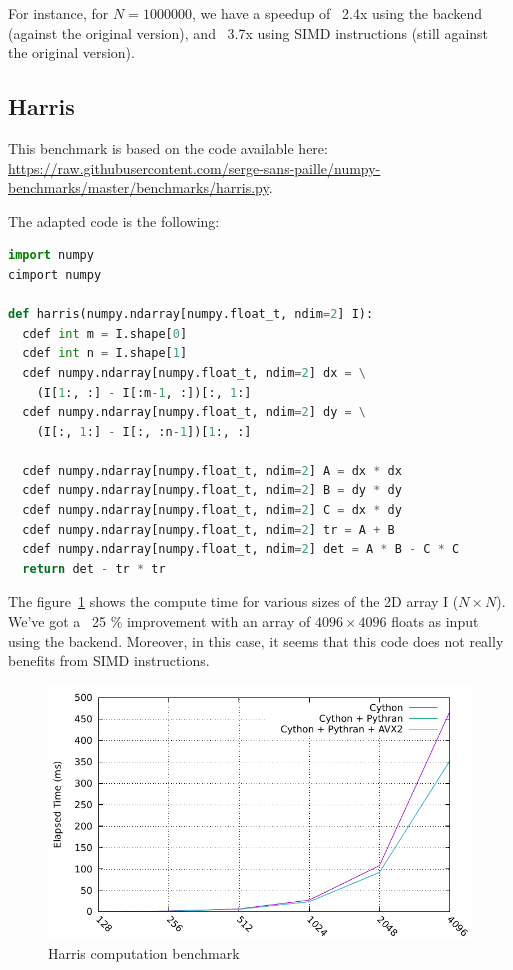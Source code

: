 \documentclass{deliverablereport}
\begin{document}
For instance, for $N = 1000000$, we have a speedup of ~2.4x using the \Pythran
backend (against the original \Cython version), and ~3.7x using SIMD
instructions (still against the original \Cython version).

\subsection{Harris}

This benchmark is based on the code available here:
\url{https://raw.githubusercontent.com/serge-sans-paille/numpy-benchmarks/master/benchmarks/harris.py}.

The adapted \Cython code is the following:

\begin{lstlisting}[language=python]
import numpy
cimport numpy

def harris(numpy.ndarray[numpy.float_t, ndim=2] I):
  cdef int m = I.shape[0]
  cdef int n = I.shape[1]
  cdef numpy.ndarray[numpy.float_t, ndim=2] dx = \
    (I[1:, :] - I[:m-1, :])[:, 1:]
  cdef numpy.ndarray[numpy.float_t, ndim=2] dy = \
    (I[:, 1:] - I[:, :n-1])[1:, :]

  cdef numpy.ndarray[numpy.float_t, ndim=2] A = dx * dx
  cdef numpy.ndarray[numpy.float_t, ndim=2] B = dy * dy
  cdef numpy.ndarray[numpy.float_t, ndim=2] C = dx * dy
  cdef numpy.ndarray[numpy.float_t, ndim=2] tr = A + B
  cdef numpy.ndarray[numpy.float_t, ndim=2] det = A * B - C * C
  return det - tr * tr
\end{lstlisting}

The figure~\ref{fig:harris_bench} shows the compute time for various sizes of
the 2D array I ($N \times N$). We've got a ~25 \% improvement with an array of
$4096 \times 4096$ floats as input using the \Pythran backend. Moreover, in this
case, it seems that this code does not really benefits from SIMD instructions.

\begin{figure}[h]
  \caption{\label{fig:harris_bench} Harris computation benchmark}
  \includegraphics{benchs/harris/graph.pdf}
\end{figure}
\end{document}
